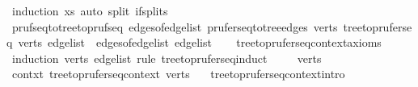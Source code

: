 \begin{isabellebody}
\ {\isacharparenleft}{\kern0pt}induction\ xs{\isacharparenright}{\kern0pt}\ {\isacharparenleft}{\kern0pt}auto\ split{\isacharcolon}{\kern0pt}\ if{\isacharunderscore}{\kern0pt}splits{\isacharparenright}{\kern0pt}%
\endisatagproof
{\isafoldproof}%
%
\isadelimproof
\ \isanewline
%
\endisadelimproof
\isanewline
\isanewline
{}\isamarkupfalse%
\ pruf{\isacharunderscore}{\kern0pt}seq{\isacharunderscore}{\kern0pt}to{\isacharunderscore}{\kern0pt}tree{\isacharunderscore}{\kern0pt}to{\isacharunderscore}{\kern0pt}pruf{\isacharunderscore}{\kern0pt}seq{\isacharcolon}{\kern0pt}\ {\isachardoublequoteopen}edges{\isacharunderscore}{\kern0pt}of{\isacharunderscore}{\kern0pt}edge{\isacharunderscore}{\kern0pt}list\ {\isacharparenleft}{\kern0pt}prufer{\isacharunderscore}{\kern0pt}seq{\isacharunderscore}{\kern0pt}to{\isacharunderscore}{\kern0pt}tree{\isacharunderscore}{\kern0pt}edges\ verts\ {\isacharparenleft}{\kern0pt}tree{\isacharunderscore}{\kern0pt}to{\isacharunderscore}{\kern0pt}prufer{\isacharunderscore}{\kern0pt}seq\ verts\ edge{\isacharunderscore}{\kern0pt}list{\isacharparenright}{\kern0pt}{\isacharparenright}{\kern0pt}\ {\isacharequal}{\kern0pt}\ edges{\isacharunderscore}{\kern0pt}of{\isacharunderscore}{\kern0pt}edge{\isacharunderscore}{\kern0pt}list\ edge{\isacharunderscore}{\kern0pt}list{\isachardoublequoteclose}\isanewline
%
\isadelimproof
\ \ %
\endisadelimproof
%
\isatagproof
{}\isamarkupfalse%
\ tree{\isacharunderscore}{\kern0pt}to{\isacharunderscore}{\kern0pt}prufer{\isacharunderscore}{\kern0pt}seq{\isacharunderscore}{\kern0pt}context{\isacharunderscore}{\kern0pt}axioms\isanewline
{}\isamarkupfalse%
\ {\isacharparenleft}{\kern0pt}induction\ verts\ edge{\isacharunderscore}{\kern0pt}list\ rule{\isacharcolon}{\kern0pt}\ tree{\isacharunderscore}{\kern0pt}to{\isacharunderscore}{\kern0pt}prufer{\isacharunderscore}{\kern0pt}seq{\isachardot}{\kern0pt}induct{\isacharparenright}{\kern0pt}\isanewline
\ \ \isamarkupfalse%
\ {\isacharparenleft}{\kern0pt}{}\ verts{\isacharparenright}{\kern0pt}\isanewline
\ \ \isamarkupfalse%
\ \isamarkupfalse%
\ contxt{\isacharcolon}{\kern0pt}\ tree{\isacharunderscore}{\kern0pt}to{\isacharunderscore}{\kern0pt}prufer{\isacharunderscore}{\kern0pt}seq{\isacharunderscore}{\kern0pt}context\ verts\ {\isachardoublequoteopen}{\isacharbrackleft}{\kern0pt}{\isacharbrackright}{\kern0pt}{\isachardoublequoteclose}\ \isamarkupfalse%
\ tree{\isacharunderscore}{\kern0pt}to{\isacharunderscore}{\kern0pt}prufer{\isacharunderscore}{\kern0pt}seq{\isacharunderscore}{\kern0pt}context{\isachardot}{\kern0pt}intro\ \isamarkupfalse%

\end{isabellebody}
